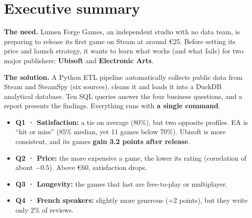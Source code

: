 \documentclass[11pt, a4paper, oneside, headings=normal, numbers=noenddot, DIV=12]{scrartcl}
\begin{document}
\begingroup
{}
\setcounter{tocdepth}{2}
\tableofcontents
\endgroup
\clearpage

\section{Executive summary}\label{sec:summary}

\textbf{The need.} Lumen Forge Games, an independent studio with no data team, is preparing to release its first game on Steam
at around €25. Before setting its price and launch strategy, it wants to learn what works (and what fails) for two major publishers:
\textbf{Ubisoft} and \textbf{Electronic Arts}.

\textbf{The solution.} A Python ETL pipeline automatically collects public data from Steam and SteamSpy (six sources), cleans it and
loads it into a DuckDB analytical database. Ten SQL queries answer the four business questions, and a report presents the findings.
Everything runs with \textbf{a single command}.


\begin{keybox}
\begin{itemize}[leftmargin=1.2em]
  \item \textbf{Q1 · Satisfaction:} a tie on average (80\%), but two opposite profiles. EA is ``hit or miss''
        (85\% median, yet 11 games below 70\%). Ubisoft is more consistent, and its games \textbf{gain 3.2 points after release}.
  \item \textbf{Q2 · Price:} the more expensive a game, the lower its rating (correlation of about $-0.5$). Above €60, satisfaction drops.
  \item \textbf{Q3 · Longevity:} the games that last are free-to-play or multiplayer.
  \item \textbf{Q4 · French speakers:} slightly more generous (+2 points), but they write only 2\% of reviews.
\end{itemize}
\end{keybox}
\end{document}
